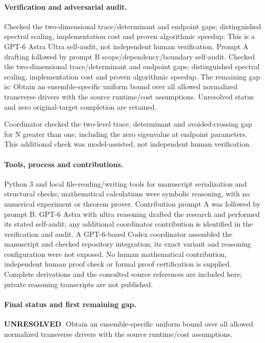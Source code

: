 \documentclass[11pt]{article}
\begin{document}
\paragraph{Verification and adversarial audit.}
Checked the two-dimensional trace/determinant and endpoint gaps; distinguished spectral scaling, implementation cost and proven algorithmic speedup. This is a GPT-6 Astra Ultra self-audit, not independent human verification. Prompt A drafting followed by prompt B scope/dependency/boundary self-audit. Checked the two-dimensional trace/determinant and endpoint gaps; distinguished spectral scaling, implementation cost and proven algorithmic speedup. The remaining gap is: Obtain an ensemble-specific uniform bound over all allowed normalized transverse drivers with the source runtime/cost assumptions. Unresolved status and zero original-target completion are retained.

Coordinator checked the two-level trace, determinant and avoided-crossing gap for N greater than one, including the zero eigenvalue at endpoint parameters. This additional check was model-assisted, not independent human verification.

\paragraph{Tools, process and contributions.}
Python 3 and local file-reading/writing tools for manuscript serialization and structural checks; mathematical calculations were symbolic reasoning, with no numerical experiment or theorem prover. Contribution prompt A was followed by prompt B. GPT-6 Astra with ultra reasoning drafted the research and performed its stated self-audit; any additional coordinator contribution is identified in the verification and audit. A GPT-6-based Codex coordinator assembled the manuscript and checked repository integration; its exact variant and reasoning configuration were not exposed. No human mathematical contribution, independent human proof check or formal proof certification is supplied. Complete derivations and the consulted source references are included here; private reasoning transcripts are not published.

\paragraph{Final status and first remaining gap.}
\textbf{UNRESOLVED}. Obtain an ensemble-specific uniform bound over all allowed normalized transverse drivers with the source runtime/cost assumptions.
\end{document}
